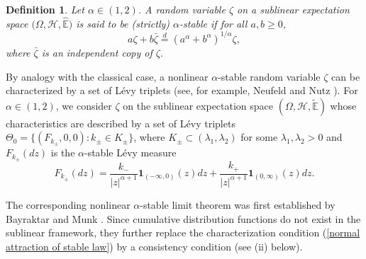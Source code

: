 \documentclass[a4paper,oneside,10pt]{article}%
\newtheorem{definition}[theorem]{Definition}
\numberwithin{equation}{section}
\begin{document}
\begin{definition}
Let $\alpha \in(1,2)$. A random variable $\zeta$ on a sublinear expectation
space $(\Omega,\mathcal{H},\mathbb{\hat{E})}$ is said to be (strictly)
$\alpha$-stable if for all $a,b\geq0$,
\[
a\zeta+b\bar{\zeta}\overset{d}{=}(a^{\alpha}+b^{\alpha})^{1/\alpha}\zeta,
\]
where $\bar{\zeta}$ is an independent copy of $\zeta$.
\end{definition}

By analogy with the classical case, a nonlinear $\alpha$-stable random
variable $\zeta$ can be characterized by a set of L\'{e}vy triplets (see, for
example, Neufeld and Nutz \cite{NN2017}). For $\alpha \in(1,2)$, we consider
$\zeta$
on the sublinear expectation space $(\Omega,\mathcal{H},\mathbb{\tilde{E}})$
whose characteristics are described by a set of L\'{e}vy triplets $\Theta
_{0}=\{(F_{k_{\pm}},0,0):k_{\pm}\in K_{\pm}\}$, where $K_{\pm}\subset
(\lambda_{1},\lambda_{2})$ for some $\lambda_{1},\lambda_{2}>0$ and
$F_{k_{\pm}}(dz)$ is the $\alpha$-stable L\'{e}vy measure
\[
F_{k_{\pm}}(dz)=\frac{k_{-}}{|z|^{\alpha+1}}\mathbf{1}_{(-\infty
,0)}(z)dz+\frac{k_{+}}{|z|^{\alpha+1}}\mathbf{1}_{(0,\infty)}(z)dz.
\]


The corresponding nonlinear $\alpha$-stable limit theorem was first
established by Bayraktar and Munk \cite[Theorem 3.1]{BM2016}.
Since cumulative distribution functions do not exist in the sublinear
framework, they further replace the characterization condition
(\ref{normal attraction of stable law}) by a consistency condition (see (ii) below).
\end{document}
